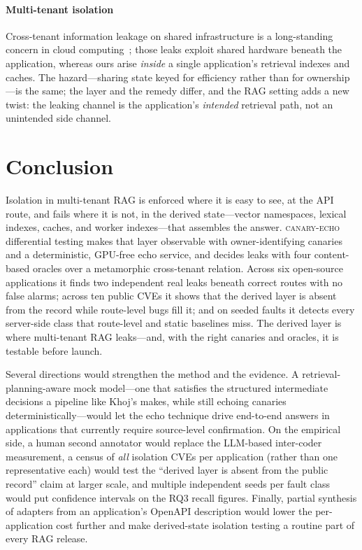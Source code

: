 \IfFileExists{IEEEtran.cls}{\documentclass[conference]{IEEEtran}}{\documentclass[10pt,twocolumn]{article}}
\newcommand{\tool}{\mbox{\textsc{canary-echo}}}
\begin{document}
\paragraph{Multi-tenant isolation}
Cross-tenant information leakage on shared infrastructure is a long-standing concern in cloud
computing~\cite{ristenpart2009cloud,zhang2012crossvm}; those leaks exploit shared hardware beneath
the application, whereas ours arise \emph{inside} a single application's retrieval indexes and
caches. The hazard---sharing state keyed for efficiency rather than for ownership---is the same; the
layer and the remedy differ, and the RAG setting adds a new twist: the leaking channel is the
application's \emph{intended} retrieval path, not an unintended side channel.

\section{Conclusion}
Isolation in multi-tenant RAG is enforced where it is easy to see, at the API route, and fails where
it is not, in the derived state---vector namespaces, lexical indexes, caches, and worker
indexes---that assembles the answer. \tool{} differential testing makes that layer observable with
owner-identifying canaries and a deterministic, GPU-free echo service, and decides leaks with four
content-based oracles over a metamorphic cross-tenant relation. Across six open-source applications
it finds two independent real leaks beneath correct routes with no false alarms; across ten public
CVEs it shows that the derived layer is absent from the record while route-level bugs fill it; and on
seeded faults it detects every server-side class that route-level and static baselines miss. The
derived layer is where multi-tenant RAG leaks---and, with the right canaries and oracles, it is
testable before launch.

Several directions would strengthen the method and the evidence. A retrieval-planning-aware mock
model---one that satisfies the structured intermediate decisions a pipeline like Khoj's makes, while
still echoing canaries deterministically---would let the echo technique drive end-to-end answers in
applications that currently require source-level confirmation. On the empirical side, a human second
annotator would replace the LLM-based inter-coder measurement, a census of \emph{all} isolation CVEs
per application (rather than one representative each) would test the ``derived layer is absent from
the public record'' claim at larger scale, and multiple independent seeds per fault class would put
confidence intervals on the RQ3 recall figures. Finally, partial synthesis of adapters from an
application's OpenAPI description would lower the per-application cost further and make
derived-state isolation testing a routine part of every RAG release.

\balance


\end{document}
